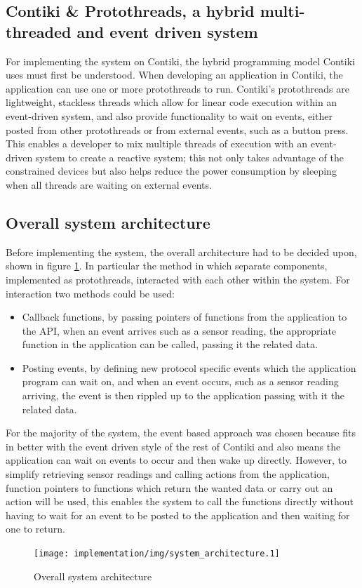 \subsection{Contiki \& Protothreads, a hybrid multi-threaded and event driven system} %
\label{sub:event_driven_system}
For implementing the system on Contiki, the hybrid programming model Contiki uses must first be understood. When developing an application in Contiki, the application can use one or more protothreads to run. Contiki's protothreads are lightweight, stackless threads which allow for linear code execution within an event-driven system, and also provide functionality to wait on events, either posted from other protothreads or from external events, such as a button press. This enables a developer to mix multiple threads of execution with an event-driven system to create a reactive system; this not only takes advantage of the constrained devices but also helps reduce the power consumption by sleeping when all threads are waiting on external events.

\subsection{Overall system architecture} %
\label{sub:protocol_system_architecture}
Before implementing the system, the overall architecture had to be decided upon, shown in figure \ref{fig:system_architecture}. In particular the method in which separate components, implemented as protothreads, interacted with each other within the system. For interaction two methods could be used:
\begin{itemize}
	\item Callback functions, by passing pointers of functions from the application to the API, when an event arrives such as a sensor reading, the appropriate function in the application can be called, passing it the related data. 
	\item Posting events, by defining new protocol specific events which the application program can wait on, and when an event occurs, such as a sensor reading arriving, the event is then rippled up to the application passing with it the related data.
\end{itemize}

For the majority of the system, the event based approach was chosen because fits in better with the event driven style of the rest of Contiki and also means the application can wait on events to occur and then wake up directly.
However, to simplify retrieving sensor readings and calling actions from the application, function pointers to functions which return the wanted data or carry out an action will be used, this enables the system to call the functions directly without having to wait for an event to be posted to the application and then waiting for one to return.
\begin{figure}[h!]
\centering
\texttt{[image: implementation/img/system\_architecture.1]}
\caption{Overall system architecture}
\label{fig:system_architecture}
\end{figure}

